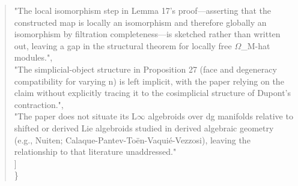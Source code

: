 \documentclass[11pt]{article}
\begin{document}
\begin{quote}
    "The local isomorphism step in Lemma 17's proof---asserting that the constructed map is locally an isomorphism and therefore globally an isomorphism by filtration completeness---is sketched rather than written out, leaving a gap in the structural theorem for locally free \ensuremath{\Omega}\_M-hat modules.",\\
    "The simplicial-object structure in Proposition 27 (face and degeneracy compatibility for varying n) is left implicit, with the paper relying on the claim without explicitly tracing it to the cosimplicial structure of Dupont's contraction.",\\
    "The paper does not situate its L\ensuremath{\infty} algebroids over dg manifolds relative to shifted or derived Lie algebroids studied in derived algebraic geometry (e.g., Nuiten; Calaque-Pantev-Toën-Vaquié-Vezzosi), leaving the relationship to that literature unaddressed."\\
  ]\\
\}\\
\end{quote}
\end{document}
